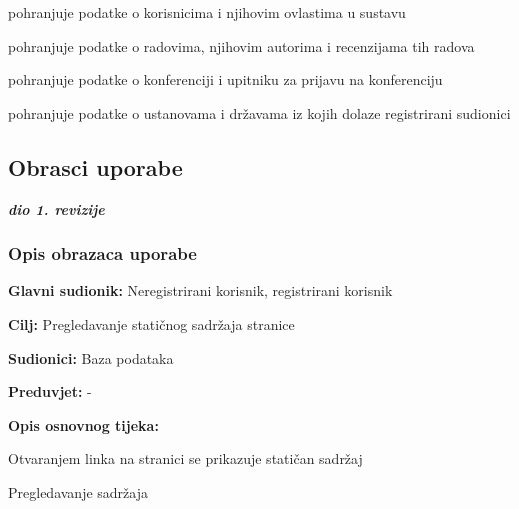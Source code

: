 \begin{packed_enum}
\begin{packed_enum}
\begin{packed_enum}
					\end{packed_enum}
				\end{packed_enum}


				\item {}

				\begin{packed_enum}

					\item pohranjuje podatke o korisnicima i njihovim ovlastima u sustavu
					\item pohranjuje podatke o radovima, njihovim autorima i recenzijama tih radova
					\item pohranjuje podatke o konferenciji i upitniku za prijavu na konferenciju
					\item pohranjuje podatke o ustanovama i državama iz kojih dolaze registrirani sudionici

				\end{packed_enum}
					
			\end{packed_enum}
			
			\eject 
			
			
				
			\subsection{Obrasci uporabe}
				
				\textbf{\textit{dio 1. revizije}}
				
				\subsubsection{Opis obrazaca uporabe}
					
					\noindent {}
					\begin{packed_item}
	
						\item \textbf{Glavni sudionik: } Neregistrirani korisnik, registrirani korisnik
						\item  \textbf{Cilj:} Pregledavanje statičnog sadržaja stranice
						\item  \textbf{Sudionici:} Baza podataka
						\item  \textbf{Preduvjet:} -
						\item  \textbf{Opis osnovnog tijeka:}
						
						\item[] \begin{packed_enum}
	
							\item Otvaranjem linka na stranici se prikazuje statičan sadržaj
							\item Pregledavanje sadržaja
						\end{packed_enum}
						

					\end{packed_item}

